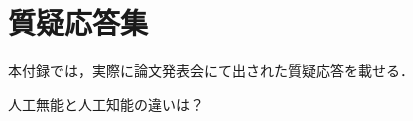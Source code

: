 \chapter{質疑応答集}
本付録では，実際に論文発表会にて出された質疑応答を載せる．
\vspace{1cm}

\begin{questions}
{人工無能と人工知能の違いは？}

%
%
%
\end{questions}

